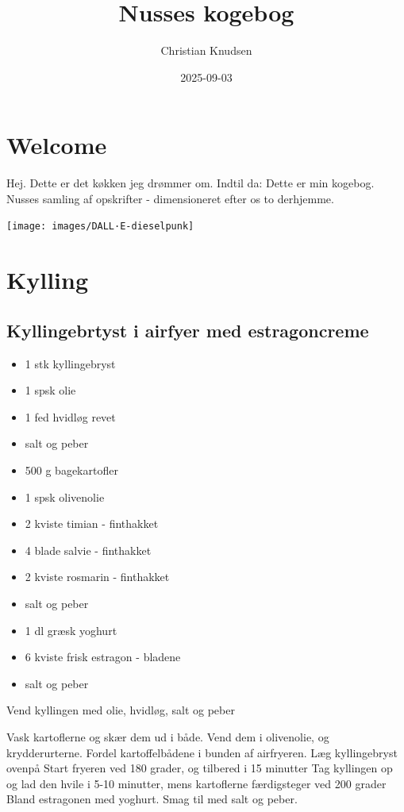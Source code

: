 \documentclass[
]{book}
\title{Nusses kogebog}
\author{Christian Knudsen}
\date{2025-09-03}
\begin{document}
\maketitle

{
\setcounter{tocdepth}{1}
\tableofcontents
}
\hypertarget{welcome}{%
\chapter{Welcome}\label{welcome}}

Hej. Dette er det køkken jeg drømmer om. Indtil da:
Dette er min kogebog. Nusses samling af opskrifter - dimensioneret efter os to derhjemme.

\texttt{[image: images/DALL·E-dieselpunk]}

\hypertarget{kylling}{%
\chapter{Kylling}\label{kylling}}

\hypertarget{kyllingebrtyst-i-airfyer-med-estragoncreme}{%
\section{Kyllingebrtyst i airfyer med estragoncreme}\label{kyllingebrtyst-i-airfyer-med-estragoncreme}}

\begin{itemize}
\item
  1 stk kyllingebryst
\item
  1 spsk olie
\item
  1 fed hvidløg revet
\item
  salt og peber
\item
  500 g bagekartofler
\item
  1 spsk olivenolie
\item
  2 kviste timian - finthakket
\item
  4 blade salvie - finthakket
\item
  2 kviste rosmarin - finthakket
\item
  salt og peber
\item
  1 dl græsk yoghurt
\item
  6 kviste frisk estragon - bladene
\item
  salt og peber
\end{itemize}

Vend kyllingen med olie, hvidløg, salt og peber

Vask kartoflerne og skær dem ud i både. Vend dem i olivenolie, og krydderurterne.
Fordel kartoffelbådene i bunden af airfryeren. Læg kyllingebryst ovenpå
Start fryeren ved 180 grader, og tilbered i 15 minutter
Tag kyllingen op og lad den hvile i 5-10 minutter, mens kartoflerne færdigsteger ved 200 grader
Bland estragonen med yoghurt. Smag til med salt og peber.
\end{document}
